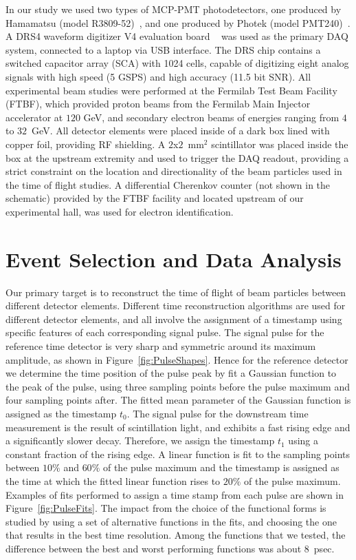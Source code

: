 \documentclass[12pt]{article}
\begin{document}
In our study we used two types of MCP-PMT photodetectors, one produced by Hamamatsu 
(model R3809-52)~\cite{HamamatsuMCP3809}, and one produced by Photek (model
PMT240)~\cite{Photek240}. A DRS4  waveform digitizer V4 evaluation
board ~\cite{DRS4} was used as the primary DAQ system, connected to a laptop via
USB interface.  The DRS chip contains a switched capacitor array (SCA) with 1024 cells, 
capable of digitizing eight analog signals with high speed (5 GSPS) and high 
accuracy (11.5 bit SNR). All experimental beam studies were performed at the Fermilab Test
Beam Facility (FTBF), which provided proton beams from the Fermilab Main
Injector accelerator at $120$ GeV, and secondary electron beams of energies
ranging from $4$ to $32$~GeV. All detector elements were placed inside of a dark box
lined with copper foil, providing RF shielding. A $2$x$2$~$\mathrm{mm}^{2}$
scintillator was placed inside the box at the upstream extremity and used to
trigger the DAQ readout, providing a strict constraint on the
location and directionality of the beam particles used in the time of flight
studies. A differential Cherenkov counter (not shown in the schematic)  provided by the FTBF
facility and located upstream of our experimental hall,  was used for electron
identification. 

\section{Event Selection and Data Analysis}

Our primary target is to reconstruct the time of flight of beam particles between
different detector elements. Different time reconstruction algorithms are used
for different detector elements, and all involve the assignment of a timestamp
using specific features of each corresponding signal pulse. The signal pulse for
the reference time detector is very sharp and symmetric around its maximum
amplitude, as shown in Figure~\ref{fig:PulseShapes}. Hence for the reference
detector we determine the time position of the pulse peak by fit a Gaussian
function to the peak of the pulse, using three sampling points before the pulse
maximum and four sampling points after. The fitted mean parameter of the
Gaussian function is assigned as the timestamp $t_{0}$. The signal pulse for the
downstream time measurement is the result of scintillation light, and exhibits a
fast rising edge and a significantly slower decay. Therefore, we assign the
timestamp $t_{1}$ using a constant fraction of the rising edge. A linear
function is fit to the sampling points between $10\%$ and $60\%$ of the pulse
maximum and the timestamp is assigned as the time at which the fitted linear
function rises to $20\%$ of the pulse maximum. Examples of fits performed to
assign a time stamp from each pulse are shown in Figure~\ref{fig:PulseFits}. The
impact from the choice of the functional forms is studied by using a set of
alternative functions in the fits, and choosing the one that results in the best
time resolution. Among the functions that we tested, the difference between the
best and worst performing functions was about 8~psec.
\end{document}
